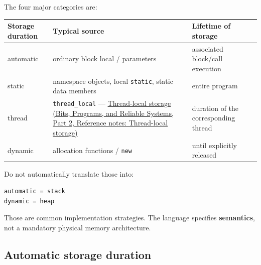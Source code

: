 The four major categories are:

{\def\LTcaptype{none} %
\begin{longtable}[]{@{}
  >{\raggedright\arraybackslash}p{}
  >{\raggedright\arraybackslash}p{}
  >{\raggedright\arraybackslash}p{}@{}}
\toprule\noalign{}
\begin{minipage}[b]{\linewidth}\raggedright
Storage duration
\end{minipage} & \begin{minipage}[b]{\linewidth}\raggedright
Typical source
\end{minipage} & \begin{minipage}[b]{\linewidth}\raggedright
Lifetime of storage
\end{minipage} \\
\midrule\noalign{}
\endhead
\bottomrule\noalign{}
\endlastfoot
automatic & ordinary block local / parameters & associated block/call execution \\
static & namespace objects, local \texttt{static}, static data members & entire program \\
thread & \texttt{thread\_local} --- \href{../01-Bits-Programs-and-Reliable-Systems-P02/main.pdf\#nameddest=appendix-3b88c6cd7195}{Thread-local storage (Bits, Programs, and Reliable Systems, Part 2, Reference notes: Thread-local storage)} & duration of the corresponding thread \\
dynamic & allocation functions / \texttt{new} & until explicitly released \\
\end{longtable}
}

Do not automatically translate those into:

\begin{verbatim}
automatic = stack
dynamic = heap
\end{verbatim}

Those are common implementation strategies. The language specifies \textbf{semantics}, not a mandatory physical memory architecture.

\subsection{Automatic storage duration}\label{05-engine-i-ch002-automatic-storage-duration}

\hypertarget{05-engine-i-ch002-automatic-storage-duration}{}

